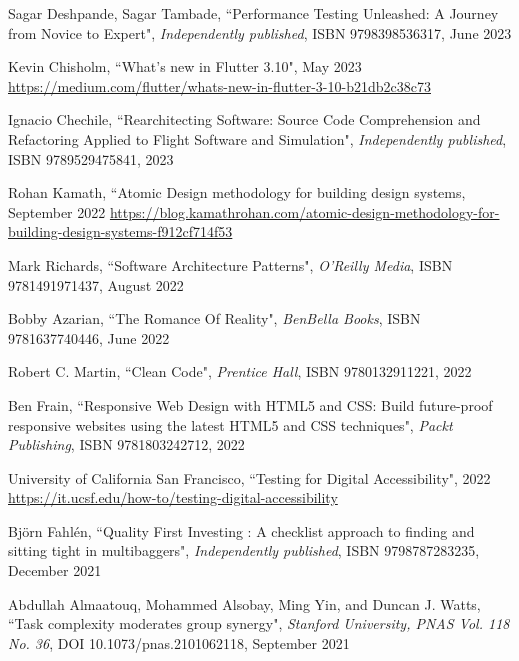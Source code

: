 \begin{thebibliography}{100}
 Sagar Deshpande, Sagar Tambade, ``Performance Testing Unleashed: A Journey from Novice to Expert", 
\emph{Independently published}, ISBN 9798398536317, June 2023

 Kevin Chisholm, ``What's new in Flutter 3.10", May 2023
\href{https://medium.com/flutter/whats-new-in-flutter-3-10-b21db2c38c73}{https://medium.com/flutter/whats-new-in-flutter-3-10-b21db2c38c73}

 Ignacio Chechile, ``Rearchitecting Software: Source Code Comprehension and Refactoring 
Applied to Flight Software and Simulation", \emph{Independently published}, ISBN 9789529475841, 2023

 Rohan Kamath, ``Atomic Design methodology for building design systems, September 2022
\href{https://blog.kamathrohan.com/atomic-design-methodology-for-building-design-systems-f912cf714f53}{https://blog.kamathrohan.com/atomic-design-methodology-for-building-design-systems-f912cf714f53}

 Mark Richards, ``Software Architecture Patterns", 
\emph{O'Reilly Media}, ISBN 9781491971437, August 2022

 Bobby Azarian, ``The Romance Of Reality", \emph{BenBella Books}, ISBN 9781637740446, June 2022

 Robert C. Martin, ``Clean Code", \emph{Prentice Hall}, ISBN 9780132911221, 2022

 Ben Frain, ``Responsive Web Design with HTML5 and CSS: Build future-proof responsive 
websites using the latest HTML5 and CSS techniques", \emph{Packt Publishing}, ISBN 9781803242712, 2022

 University of California San Francisco, ``Testing for Digital Accessibility", 2022
\href{https://it.ucsf.edu/how-to/testing-digital-accessibility}{https://it.ucsf.edu/how-to/testing-digital-accessibility}

 Björn Fahlén, ``Quality First Investing : A checklist approach to finding and sitting tight 
in multibaggers", \emph{Independently published}, ISBN 9798787283235, December 2021

 Abdullah Almaatouq, Mohammed Alsobay, Ming Yin, and Duncan J. Watts, ``Task complexity moderates 
group synergy", \emph{Stanford University, PNAS Vol. 118 No. 36}, DOI 10.1073/pnas.2101062118, September 2021


\end{thebibliography}
